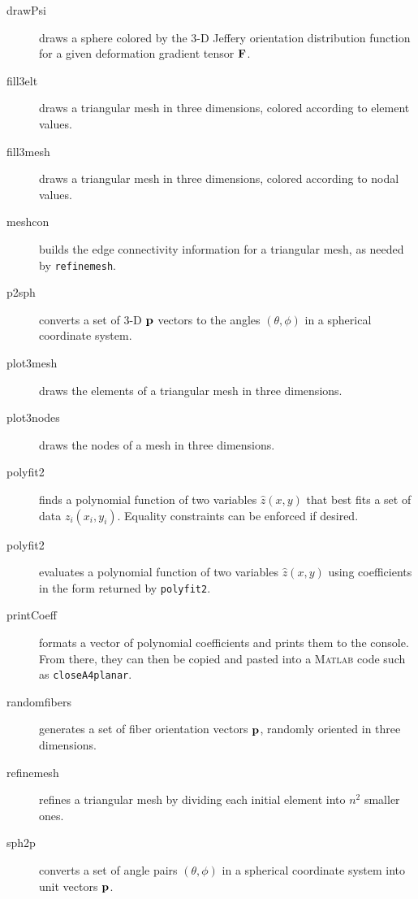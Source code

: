 \documentclass[11pt]{article}
\begin{document}
\begin{description}
    
    \item[drawPsi]{draws a sphere colored by the 3-D Jeffery orientation distribution function for a given deformation gradient tensor $\mathbf{F}$.}

    \item[fill3elt]{draws a triangular mesh in three dimensions, colored according to element values.}

    \item[fill3mesh]{draws a triangular mesh in three dimensions, colored according to nodal values.}

    \item[meshcon]{builds the edge connectivity information for a triangular mesh, as needed by \texttt{refinemesh}.}

    \item[p2sph]{converts a set of 3-D $\mathbf{p}$ vectors to the angles $(\theta, \phi)$ in a spherical coordinate system.}

    \item[plot3mesh]{draws the elements of a triangular mesh in three dimensions.}

    \item[plot3nodes]{draws the nodes of a mesh in three dimensions.}

    \item[polyfit2]{finds a polynomial function of two variables $\hat{z}(x, y)$ that best fits a set of data $z_i(x_i, y_i)$.  Equality constraints can be enforced if desired.}

    \item[polyfit2]{evaluates a polynomial function of two variables $\hat{z}(x, y)$ using coefficients in the form returned by \texttt{polyfit2}.}

    \item[printCoeff]{formats a vector of polynomial coefficients and prints them to the console.  From there, they can then be copied and pasted into a \textsc{Matlab} code such as \texttt{closeA4planar}.}
    
    \item[randomfibers]{generates a set of fiber orientation vectors $\mathbf{p}$, randomly oriented in three dimensions.}

    \item[refinemesh]{refines a triangular mesh by dividing each initial element into $n^2$ smaller ones.}

    \item[sph2p]{converts a set of angle pairs $(\theta, \phi)$ in a spherical coordinate system into unit vectors $\mathbf{p}$.}


\end{description}
\end{document}
